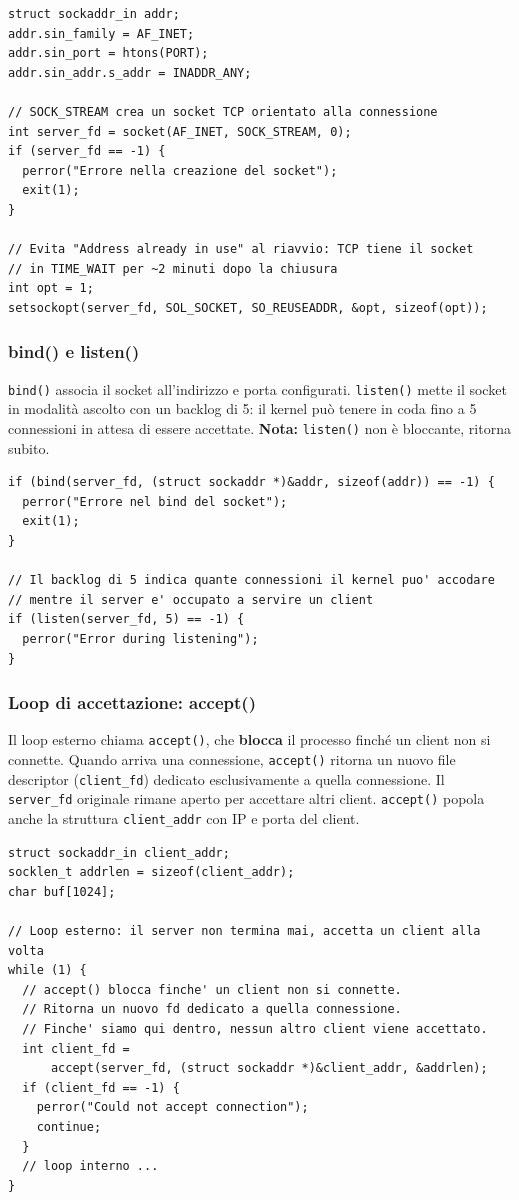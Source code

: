 \documentclass[a4paper,12pt]{article}
\begin{document}
\begin{lstlisting}[caption={server\_tcp\_block.c - socket() e SO\_REUSEADDR}]
struct sockaddr_in addr;
addr.sin_family = AF_INET;
addr.sin_port = htons(PORT);
addr.sin_addr.s_addr = INADDR_ANY;

// SOCK_STREAM crea un socket TCP orientato alla connessione
int server_fd = socket(AF_INET, SOCK_STREAM, 0);
if (server_fd == -1) {
  perror("Errore nella creazione del socket");
  exit(1);
}

// Evita "Address already in use" al riavvio: TCP tiene il socket
// in TIME_WAIT per ~2 minuti dopo la chiusura
int opt = 1;
setsockopt(server_fd, SOL_SOCKET, SO_REUSEADDR, &opt, sizeof(opt));
\end{lstlisting}
\FloatBarrier

\subsubsection{bind() e listen()}
\texttt{bind()} associa il socket all'indirizzo e porta configurati.
\texttt{listen()} mette il socket in modalità ascolto con un backlog di 5:
il kernel può tenere in coda fino a 5 connessioni in attesa di essere accettate.
\textbf{Nota:} \texttt{listen()} non è bloccante, ritorna subito.

\begin{lstlisting}[caption={server\_tcp\_block.c - bind() e listen()}]
if (bind(server_fd, (struct sockaddr *)&addr, sizeof(addr)) == -1) {
  perror("Errore nel bind del socket");
  exit(1);
}

// Il backlog di 5 indica quante connessioni il kernel puo' accodare
// mentre il server e' occupato a servire un client
if (listen(server_fd, 5) == -1) {
  perror("Error during listening");
}
\end{lstlisting}
\FloatBarrier

\subsubsection{Loop di accettazione: accept()}
Il loop esterno chiama \texttt{accept()}, che \textbf{blocca} il processo finché
un client non si connette. Quando arriva una connessione, \texttt{accept()} ritorna
un nuovo file descriptor (\texttt{client\_fd}) dedicato esclusivamente a quella
connessione. Il \texttt{server\_fd} originale rimane aperto per accettare altri client.
\texttt{accept()} popola anche la struttura \texttt{client\_addr} con IP e porta del client.

\begin{lstlisting}[caption={server\_tcp\_block.c - accept()}]
struct sockaddr_in client_addr;
socklen_t addrlen = sizeof(client_addr);
char buf[1024];

// Loop esterno: il server non termina mai, accetta un client alla volta
while (1) {
  // accept() blocca finche' un client non si connette.
  // Ritorna un nuovo fd dedicato a quella connessione.
  // Finche' siamo qui dentro, nessun altro client viene accettato.
  int client_fd =
      accept(server_fd, (struct sockaddr *)&client_addr, &addrlen);
  if (client_fd == -1) {
    perror("Could not accept connection");
    continue;
  }
  // loop interno ...
}
\end{lstlisting}
\FloatBarrier
\end{document}

